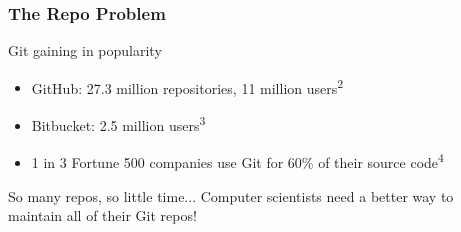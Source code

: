 \documentclass{beamer}
\begin{document}
\begin{frame}

    \centering
    \frametitle{The Repo Problem}

	\begin{block}{Git gaining in popularity}
		\begin{itemize}
			\item GitHub: 27.3 million repositories, 11 million users\textsuperscript{2}
			\item Bitbucket: 2.5 million users\textsuperscript{3}
			\item 1 in 3 Fortune 500 companies use Git for 60\% of their source code\textsuperscript{4}
		\end{itemize}
	\end{block}    
	
	\pause 
	
    \begin{block}{So many repos, so little time...}
    		Computer scientists need a better way to maintain all of their Git repos!      
    \end{block}
    
    	
\end{frame}
\end{document}
